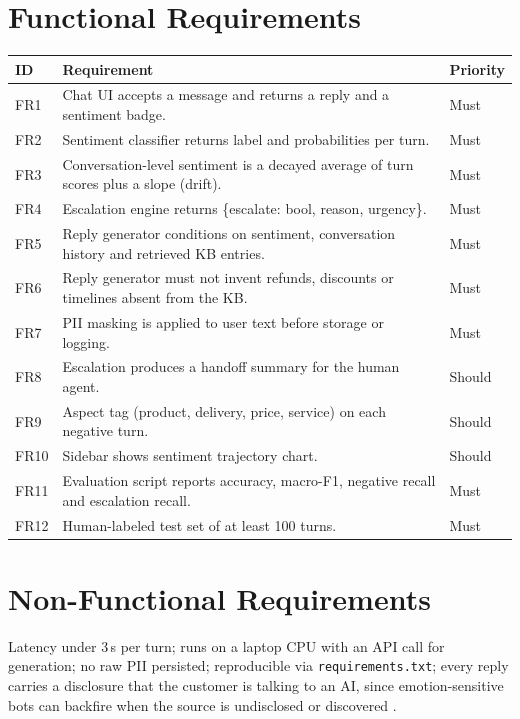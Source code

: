 \documentclass[11pt,a4paper]{article}
\begin{document}
\section{Functional Requirements}
\begin{longtable}{@{}p{1.3cm}p{10.2cm}p{2.2cm}@{}}
\toprule
\textbf{ID} & \textbf{Requirement} & \textbf{Priority}\\
\midrule
\endhead
FR1 & Chat UI accepts a message and returns a reply and a sentiment badge. & Must\\
FR2 & Sentiment classifier returns label and probabilities per turn. & Must\\
FR3 & Conversation-level sentiment is a decayed average of turn scores plus a slope (drift). & Must\\
FR4 & Escalation engine returns \{escalate: bool, reason, urgency\}. & Must\\
FR5 & Reply generator conditions on sentiment, conversation history and retrieved KB entries. & Must\\
FR6 & Reply generator must not invent refunds, discounts or timelines absent from the KB. & Must\\
FR7 & PII masking is applied to user text before storage or logging. & Must\\
FR8 & Escalation produces a handoff summary for the human agent. & Should\\
FR9 & Aspect tag (product, delivery, price, service) on each negative turn. & Should\\
FR10 & Sidebar shows sentiment trajectory chart. & Should\\
FR11 & Evaluation script reports accuracy, macro-F1, negative recall and escalation recall. & Must\\
FR12 & Human-labeled test set of at least 100 turns. & Must\\
\bottomrule
\end{longtable}

\section{Non-Functional Requirements}
Latency under 3\,s per turn; runs on a laptop CPU with an API call for generation; no raw PII persisted; reproducible via \texttt{requirements.txt}; every reply carries a disclosure that the customer is talking to an AI, since emotion-sensitive bots can backfire when the source is undisclosed or discovered \cite{brun2025}.

\end{document}
